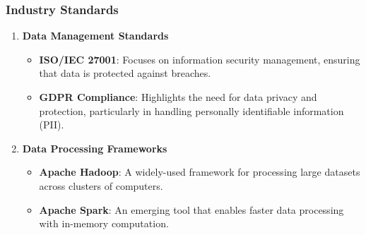 \documentclass[aspectratio=169]{beamer}
\begin{document}
\begin{frame}[fragile]
    \frametitle{Industry Standards}
    \begin{enumerate}
        \item \textbf{Data Management Standards}
            \begin{itemize}
                \item \textbf{ISO/IEC 27001}: Focuses on information security management, ensuring that data is protected against breaches.
                \item \textbf{GDPR Compliance}: Highlights the need for data privacy and protection, particularly in handling personally identifiable information (PII).
            \end{itemize}
        \item \textbf{Data Processing Frameworks}
            \begin{itemize}
                \item \textbf{Apache Hadoop}: A widely-used framework for processing large datasets across clusters of computers.
                \item \textbf{Apache Spark}: An emerging tool that enables faster data processing with in-memory computation.
            \end{itemize}
    \end{enumerate}
\end{frame}
\end{document}
